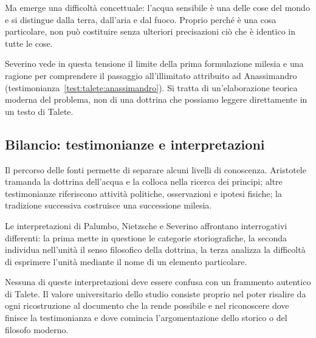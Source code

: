 Ma emerge una difficoltà concettuale: l'acqua sensibile è una delle cose del mondo e si distingue dalla terra, dall'aria e dal fuoco. Proprio perché è una cosa particolare, non può costituire senza ulteriori precisazioni ciò che è identico in tutte le cose.

Severino vede in questa tensione il limite della prima formulazione milesia e una ragione per comprendere il passaggio all'illimitato attribuito ad Anassimandro (testimonianza~\ref{test:talete:anassimandro}). Si tratta di un'elaborazione teorica moderna del problema, non di una dottrina che possiamo leggere direttamente in un testo di Talete.

\subsection{Bilancio: testimonianze e interpretazioni}

Il percorso delle fonti permette di separare alcuni livelli di conoscenza. Aristotele tramanda la dottrina dell'acqua e la colloca nella ricerca dei principi; altre testimonianze riferiscono attività politiche, osservazioni e ipotesi fisiche; la tradizione successiva costruisce una successione milesia.

Le interpretazioni di Palumbo, Nietzsche e Severino affrontano interrogativi differenti: la prima mette in questione le categorie storiografiche, la seconda individua nell'unità il senso filosofico della dottrina, la terza analizza la difficoltà di esprimere l'unità mediante il nome di un elemento particolare.

Nessuna di queste interpretazioni deve essere confusa con un frammento autentico di Talete. Il valore universitario dello studio consiste proprio nel poter risalire da ogni ricostruzione al documento che la rende possibile e nel riconoscere dove finisce la testimonianza e dove comincia l'argomentazione dello storico o del filosofo moderno.

\printbibliography[heading=none]
